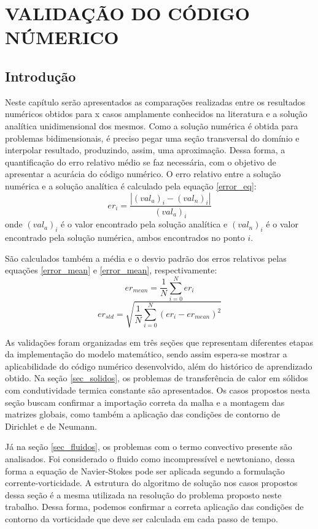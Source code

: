 \chapter{VALIDAÇÃO DO CÓDIGO NÚMERICO}
\label{validacao}
\section{\textbf{Introdução}}
Neste capítulo serão apresentados as comparações realizadas entre os resultados numéricos obtidos para x casos amplamente conhecidos na literatura e a solução analítica unidimensional dos mesmos.
Como a solução numérica é obtida para problemas bidimensionais, é preciso pegar uma seção transversal do domínio e interpolar  resultado, produzindo, assim, uma aproximação.
Dessa forma, a quantificação do erro relativo médio se faz necessária, com o objetivo de apresentar a acurácia do código numérico. O erro relativo entre a solução numérica e a solução analítica é calculado pela equação \eqref{error_eq}:
\begin{equation}
    er_i = \frac{|(val_a)_i - (val_n)_i|}{(val_a)_i}
    \label{error_eq} 
\end{equation}
onde $(val_a)_i$ é o valor encontrado pela solução analítica e $(val_n)_i$ é o valor encontrado pela solução numérica, ambos encontrados no ponto $i$.

São calculados também a média e o desvio padrão dos erros relativos pelas equações \eqref{error_mean} e \eqref{error_mean}, respectivamente:
\begin{equation}
    er_{mean} = \frac{1}{N}\sum_{i=0}^{N} er_i
    \label{error_mean}
\end{equation}
\begin{equation}
    er_{std} = \sqrt{\frac{1}{N}\sum_{i=0}^{N} (er_i-er_{mean})^2}
    \label{error_std} 
\end{equation}

As validações foram organizadas em três seções que representam diferentes etapas da implementação do modelo matemático, sendo assim espera-se mostrar a aplicabilidade do código numérico desenvolvido, além do histórico de aprendizado obtido.
Na seção \ref{sec_solidos}, os problemas de transferência de calor em sólidos com condutividade termica constante são apresentados.
Os casos propostos nesta seção buscam confirmar a importação correta da malha e a montagem das matrizes globais, como também a aplicação das condições de contorno de Dirichlet e de Neumann.

Já na seção \ref{sec_fluidos}, os problemas com o termo convectivo presente são analisados.
Foi considerado o fluido como incompressível e newtoniano, dessa forma a equação de Navier-Stokes pode ser aplicada segundo a formulação corrente-vorticidade.
A estrutura do algoritmo de solução nos casos propostos dessa seção é a mesma utilizada na resolução do problema proposto neste trabalho.
Dessa forma, podemos confirmar a correta aplicação das condições de contorno da vorticidade que deve ser calculada em cada passo de tempo.

